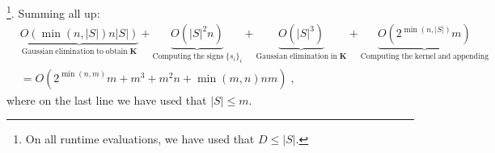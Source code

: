 \documentclass[10pt,aps,pra,twocolumn,floatfix,nofootinbib,superscriptaddress,longbibliography]{revtex4-2}
\newcommand{\1}{\mathbbm{1}}
\begin{document}
    \footnote{On all runtime evaluations, we have used that $D \leq |S|$.}. Summing all up:
    \begin{align}
        &\underbrace{O(\min(n, |S|) n |S|) }_{\mathrm{Gaussian\;elimination\;to\;obtain\;}\mathbf K}+ \underbrace{O(|S|^2 n)}_{\mathrm{Computing\;the\;signs\;}\{s_i\}_i} +\underbrace{O(|S|^3)}_{\mathrm{Gaussian\;elimination\;in\;}\mathbf K} + \underbrace{O( 2^{\min(n, |S|)} m)}_{\mathrm{Computing \;the\;kernel\;and\;appending}}\\
        &=O(2^{\min(n, m)}m + m^3+m^2n + \min(m,n)nm)\;,
    \end{align}
    where on the last line we have used that $|S| \leq m$.

\end{document}
